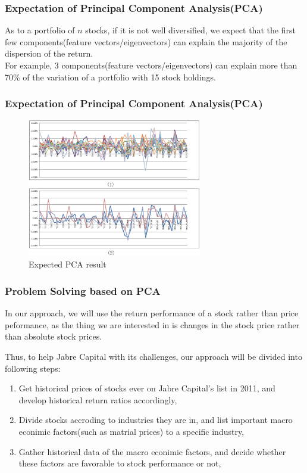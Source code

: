 \documentclass[compress,handout,10pt]{beamer}
\let\olditem\item
\renewcommand{\item}{\setlength{\itemsep}{0.5\baselineskip}\olditem}
\begin{document}
\begin{frame}
    \frametitle{Expectation of Principal Component Analysis(PCA)}
As to a portfolio of $n$ stocks, if it is not well diversified, we expect that the first few components(feature vectors/eigenvectors) can explain the majority of the dispersion of the return. \\
For example, 3 components(feature vectors/eigenvectors) can explain more than 70\% of the variation of a portfolio with 15 stock holdings.
\end{frame}

\begin{frame}
    \frametitle{Expectation of Principal Component Analysis(PCA)}
\begin{figure}[h]
\begin{center}
\includegraphics[width=3in]{images/9.png}
\end{center}
\caption{Expected PCA result}
\label{fig:penguin}
\end{figure}
\end{frame}

\begin{frame}
    \frametitle{Problem Solving based on PCA}
In our approach, we will use the return performance of a stock rather than price peformance, as the thing we are interested in is changes in the stock price rather than absolute stock prices.

Thus, to help Jabre Capital with its challenges, our approach will be divided into following steps:
\begin{enumerate}
\item Get historical prices of stocks ever on Jabre Capital's list in 2011, and develop historical return ratios accordingly,
\item Divide stocks accroding to industries they are in, and list important macro econimic factors(such as matrial prices) to a specific industry,
\item Gather historical data of the macro econimic factors, and decide whether these factors are favorable to stock performance or not,
\end{enumerate}
\end{frame}
\end{document}
